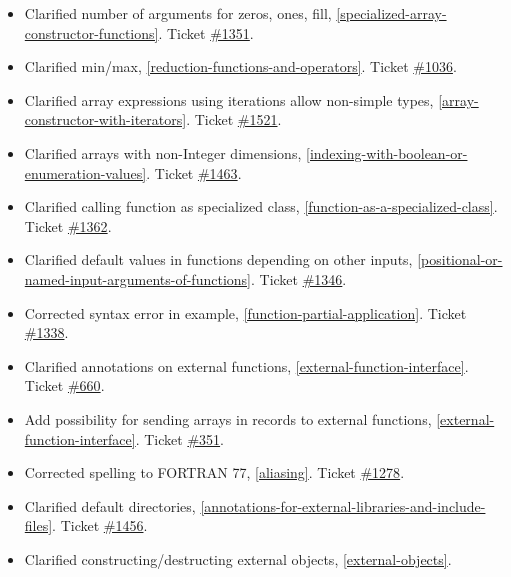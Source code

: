 \begin{itemize}
\item
  Clarified number of arguments for zeros, ones, fill, \autoref{specialized-array-constructor-functions}.
  Ticket \href{https://github.com/modelica/ModelicaSpecification/issues/1351}{\#1351}.
\item
  Clarified min/max, \autoref{reduction-functions-and-operators}. Ticket
  \href{https://github.com/modelica/ModelicaSpecification/issues/1036}{\#1036}.
\item
  Clarified array expressions using iterations allow non-simple types,
  \autoref{array-constructor-with-iterators}. Ticket
  \href{https://github.com/modelica/ModelicaSpecification/issues/1521}{\#1521}.
\item
  Clarified arrays with non-Integer dimensions, \autoref{indexing-with-boolean-or-enumeration-values}. Ticket
  \href{https://github.com/modelica/ModelicaSpecification/issues/1463}{\#1463}.
\item
  Clarified calling function as specialized class, \autoref{function-as-a-specialized-class}. Ticket
  \href{https://github.com/modelica/ModelicaSpecification/issues/1362}{\#1362}.
\item
  Clarified default values in functions depending on other inputs,
  \autoref{positional-or-named-input-arguments-of-functions}. Ticket
  \href{https://github.com/modelica/ModelicaSpecification/issues/1346}{\#1346}.
\item
  Corrected syntax error in example, \autoref{function-partial-application}. Ticket
  \href{https://github.com/modelica/ModelicaSpecification/issues/1338}{\#1338}.
\item
  Clarified annotations on external functions, \autoref{external-function-interface}. Ticket
  \href{https://github.com/modelica/ModelicaSpecification/issues/660}{\#660}.
\item
  Add possibility for sending arrays in records to external functions,
  \autoref{external-function-interface}. Ticket
  \href{https://github.com/modelica/ModelicaSpecification/issues/351}{\#351}.
\item
  Corrected spelling to FORTRAN 77, \autoref{aliasing}. Ticket
  \href{https://github.com/modelica/ModelicaSpecification/issues/1278}{\#1278}.
\item
  Clarified default directories, \autoref{annotations-for-external-libraries-and-include-files}. Ticket
  \href{https://github.com/modelica/ModelicaSpecification/issues/1456}{\#1456}.
\item
  Clarified constructing/destructing external objects, \autoref{external-objects}.

\end{itemize}
